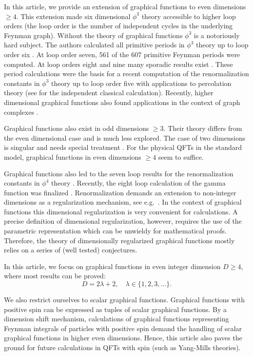 \documentclass[oneside]{amsart}
\theoremstyle{plain}
\begin{document}
In this article, we provide an extension of graphical functions to even dimensions $\geq4$. This extension made six dimensional $\phi^3$ theory accessible to higher loop orders
(the loop order is the number of independent cycles in the underlying Feynman graph). Without the theory of graphical functions $\phi^3$ is a notoriously hard subject.
The authors calculated all primitive periods in $\phi^3$ theory up to loop order six \cite{phi3,Shlog}.
At loop order seven, 561 of the 607 primitive Feynman periods were computed. At loop orders eight and nine many sporadic results exist \cite{phi3,Shlog}.
These period calculations were the basis for a recent computation of the renormalization constants in $\phi^3$ theory up to loop order
five with applications to percolation theory \cite{5loopphi3} (see \cite{classphi3} for the independent classical calculation).
Recently, higher dimensional graphical functions also found applications in the context of graph complexes \cite{Bidf}.

Graphical functions also exist in odd dimensions $\geq3$. Their theory differs from the even dimensional case and is much less explored. 
The case of two dimensions is singular and needs special treatment \cite{gf}.
For the physical QFTs in the standard model, graphical functions in even dimensions $\geq4$ seem to suffice.

Graphical functions also led to the seven loop results for the renormalization constants in $\phi^4$ theory \cite{numfunct,7loops}.
Recently, the eight loop calculation of the gamma function was finalized \cite{Shlog}.
Renormalization demands an extension to non-integer dimensions as a regularization mechanism, see e.g.\ \cite{par,IZ}.
In the context of graphical functions this dimensional regularization is very convenient for calculations.
A precise definition of dimensional regularization, however, requires the use of the parametric representation which can be unwieldy for mathematical proofs.
Therefore, the theory of dimensionally regularized graphical functions mostly relies on a series of (well tested) conjectures.

In this article, we focus on graphical functions in even integer dimension $D\geq4$, where most results can be proved:
\begin{equation}\label{eqD}
D=2\lambda+2,\quad\lambda\in\{1,2,3,\ldots\}.
\end{equation}

We also restrict ourselves to scalar graphical functions. Graphical functions with positive spin can be expressed as tuples of scalar graphical functions.
By a dimension shift mechanism, calculations of graphical functions representing Feynman integrals of particles with positive spin demand the handling of scalar graphical
functions in higher even dimensions. Hence, this article also paves the ground for future calculations in QFTs with spin (such as Yang-Mills theories).
\end{document}
